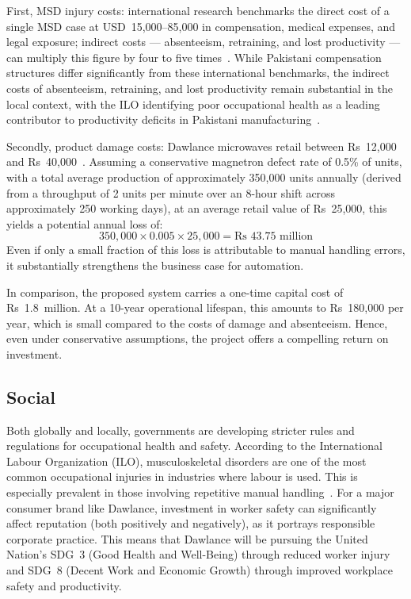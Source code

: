 First, MSD injury costs: international research benchmarks the direct cost of a single MSD case at USD~15,000--85,000 in compensation, medical expenses, and legal exposure; indirect costs --- absenteeism, retraining, and lost productivity --- can multiply this figure by four to five times~\cite{ergocenter,osha_costs}. While Pakistani compensation structures differ significantly from these international benchmarks, the indirect costs of absenteeism, retraining, and lost productivity remain substantial in the local context, with the ILO identifying poor occupational health as a leading contributor to productivity deficits in Pakistani manufacturing~\cite{pakistan_ohs}.

Secondly, product damage costs: Dawlance microwaves retail between Rs~12,000 and Rs~40,000~\cite{megapk}. Assuming a conservative magnetron defect rate of 0.5\% of units, with a total average production of approximately 350,000 units annually (derived from a throughput of 2 units per minute over an 8-hour shift across approximately 250 working days), at an average retail value of Rs~25,000, this yields a potential annual loss of:
\[
350{,}000 \times 0.005 \times 25{,}000 = \text{Rs~43.75~million}
\]
Even if only a small fraction of this loss is attributable to manual handling errors, it substantially strengthens the business case for automation.

In comparison, the proposed system carries a one-time capital cost of Rs~1.8~million. At a 10-year operational lifespan, this amounts to Rs~180,000 per year, which is small compared to the costs of damage and absenteeism. Hence, even under conservative assumptions, the project offers a compelling return on investment.

\subsection{Social}

Both globally and locally, governments are developing stricter rules and regulations for occupational health and safety. According to the International Labour Organization (ILO), musculoskeletal disorders are one of the most common occupational injuries in industries where labour is used. This is especially prevalent in those involving repetitive manual handling~\cite{ilo_safety}. For a major consumer brand like Dawlance, investment in worker safety can significantly affect reputation (both positively and negatively), as it portrays responsible corporate practice. This means that Dawlance will be pursuing the United Nation's SDG~3 (Good Health and Well-Being) through reduced worker injury and SDG~8 (Decent Work and Economic Growth) through improved workplace safety and productivity.

